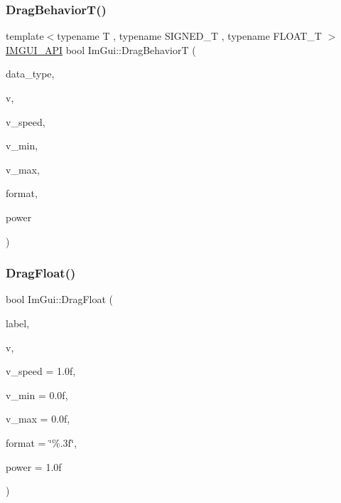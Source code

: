 \subsubsection{\texorpdfstring{Drag\+Behavior\+T()}{DragBehaviorT()}}
{\footnotesize\ttfamily template$<$typename T , typename S\+I\+G\+N\+E\+D\+\_\+T , typename F\+L\+O\+A\+T\+\_\+T $>$ \\
\mbox{\hyperlink{imgui_8h_a43829975e84e45d1149597467a14bbf5}{I\+M\+G\+U\+I\+\_\+\+A\+PI}} bool Im\+Gui\+::\+Drag\+BehaviorT (\begin{DoxyParamCaption}\item[{\mbox{\hyperlink{imgui_8h_a4cfa8697a3d76722fff83eb18922e9d5}{Im\+Gui\+Data\+Type}}}]{data\+\_\+type,  }\item[{T $\ast$}]{v,  }\item[{float}]{v\+\_\+speed,  }\item[{const T}]{v\+\_\+min,  }\item[{const T}]{v\+\_\+max,  }\item[{const char $\ast$}]{format,  }\item[{float}]{power }\end{DoxyParamCaption})}

\mbox{\label{namespace_im_gui_aa797a92d52ffa907cb5186a8476f1c20}} 
\subsubsection{\texorpdfstring{Drag\+Float()}{DragFloat()}}
{\footnotesize\ttfamily bool Im\+Gui\+::\+Drag\+Float (\begin{DoxyParamCaption}\item[{const char $\ast$}]{label,  }\item[{float $\ast$}]{v,  }\item[{float}]{v\+\_\+speed = {\ttfamily 1.0f},  }\item[{float}]{v\+\_\+min = {\ttfamily 0.0f},  }\item[{float}]{v\+\_\+max = {\ttfamily 0.0f},  }\item[{const char $\ast$}]{format = {\ttfamily \char`\"{}\%.3f\char`\"{}},  }\item[{float}]{power = {\ttfamily 1.0f} }\end{DoxyParamCaption})}

